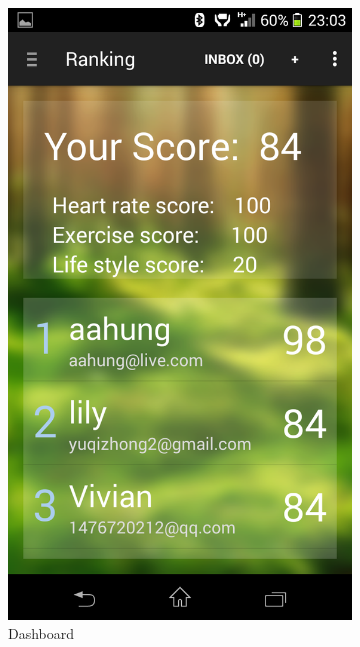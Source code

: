 \begin{figure}
\begin{subfigure}{.24\textwidth}
  \includegraphics[width=.8\linewidth]{img/screenshot/ss8.png}
  \caption{Dashboard}
\end{subfigure}%
\begin{subfigure}{.24\textwidth}
  \centering

\end{subfigure}
\end{figure}

